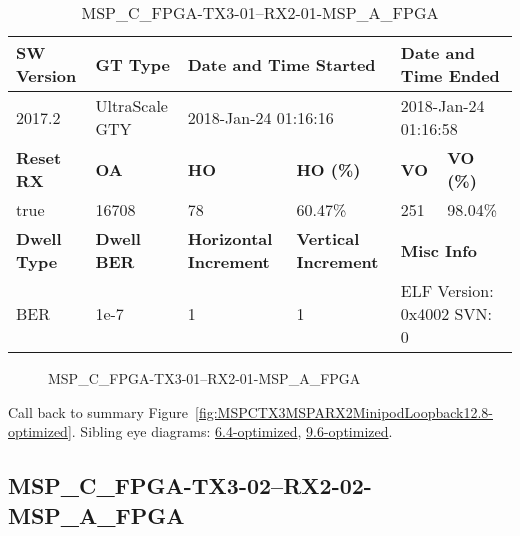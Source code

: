 \begin{table}[h]
\centering
\caption{MSP\_C\_FPGA-TX3-01--RX2-01-MSP\_A\_FPGA}
\label{tab:MSPCFPGATX301RX201MSPAFPGA12.8-optimized}
\begin{tabular}{@{}|l|l|l|l|l|l|@{}}
\toprule
\textbf{SW Version}                & \textbf{GT Type}   & \multicolumn{2}{l|}{\textbf{Date and Time Started}}            & \multicolumn{2}{l|}{\textbf{Date and Time Ended}}        \\ \midrule
2017.2                       & UltraScale GTY          & \multicolumn{2}{l|}{2018-Jan-24 01:16:16}                   & \multicolumn{2}{l|}{2018-Jan-24 01:16:58}               \\ \midrule
\textbf{Reset RX}                  & \textbf{OA} & \textbf{HO}   & \textbf{HO (\%)} & \textbf{VO} & \textbf{VO (\%)} \\ \midrule
true & 16708        & 78          & 60.47\%        & 251        & 98.04\%       \\ \midrule
\textbf{Dwell Type}                & \textbf{Dwell BER} & \textbf{Horizontal Increment} & \textbf{Vertical Increment}    & \multicolumn{2}{l|}{\textbf{Misc Info}}                  \\ \midrule
BER                            & 1e-7        & 1        & 1           & \multicolumn{2}{l|}{ELF Version: 0x4002 SVN: 0}                         \\ \bottomrule
\end{tabular}
\end{table}

\begin{figure}[h]
\caption{MSP\_C\_FPGA-TX3-01--RX2-01-MSP\_A\_FPGA} \label{fig:MSPCFPGATX301RX201MSPAFPGA12.8-optimized}
\end{figure}

Call back to summary Figure~\ref{fig:MSPCTX3MSPARX2MinipodLoopback12.8-optimized}.
Sibling eye diagrams: \hyperref[sec:MSPCFPGATX301RX201MSPAFPGA6.4-optimized]{6.4-optimized}, \hyperref[sec:MSPCFPGATX301RX201MSPAFPGA9.6-optimized]{9.6-optimized}.

\clearpage
\newpage


\subsection{MSP\_C\_FPGA-TX3-02--RX2-02-MSP\_A\_FPGA}\label{sec:MSPCFPGATX302RX202MSPAFPGA12.8-optimized}

